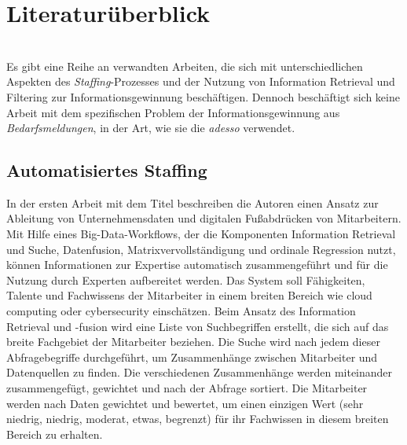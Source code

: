 \chapter{Literaturüberblick}
\\
Es gibt eine Reihe an verwandten Arbeiten, die sich mit unterschiedlichen Aspekten des \emph{Staffing}-Prozesses und der Nutzung von Information Retrieval und Filtering zur Informationsgewinnung beschäftigen. Dennoch beschäftigt sich keine Arbeit mit dem spezifischen Problem der Informationsgewinnung aus \emph{Bedarfsmeldungen}, in der Art, wie sie die \emph{adesso} verwendet.

\section{Automatisiertes Staffing}
In der ersten Arbeit mit dem Titel \cite{horesh2016information} beschreiben die Autoren \citeauthor{horesh2016information} einen Ansatz zur Ableitung von Unternehmensdaten und digitalen Fußabdrücken von Mitarbeitern. Mit Hilfe eines Big-Data-Workflows, der die Komponenten Information Retrieval und Suche, Datenfusion, Matrixvervollständigung und ordinale Regression nutzt, können Informationen zur Expertise automatisch zusammengeführt und für die Nutzung durch Experten aufbereitet werden. Das System soll Fähigkeiten, Talente und Fachwissens der Mitarbeiter in einem breiten Bereich wie cloud computing oder cybersecurity einschätzen. Beim Ansatz des Information Retrieval und -fusion wird eine Liste von Suchbegriffen erstellt, die sich auf das breite Fachgebiet der Mitarbeiter beziehen. Die Suche wird nach jedem dieser Abfragebegriffe durchgeführt, um Zusammenhänge zwischen Mitarbeiter und Datenquellen zu finden. Die verschiedenen Zusammenhänge werden miteinander zusammengefügt, gewichtet und nach der Abfrage sortiert. Die Mitarbeiter werden nach Daten gewichtet und bewertet, um einen einzigen Wert (sehr niedrig, niedrig, moderat, etwas, begrenzt) für ihr Fachwissen in diesem breiten Bereich zu erhalten.\\

